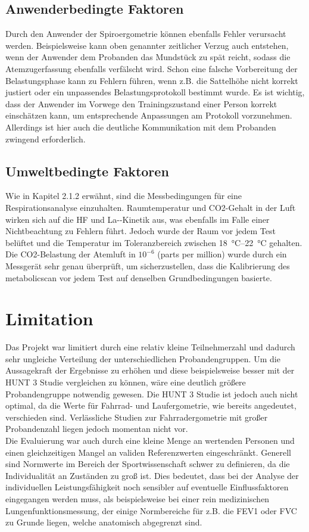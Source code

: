 \subsection{Anwenderbedingte Faktoren}
%
Durch den Anwender der Spiroergometrie können ebenfalls Fehler verursacht werden. Beispielsweise kann oben genannter zeitlicher Verzug auch entstehen, wenn der Anwender dem Probanden das Mundstück zu spät reicht, sodass die Atemzugerfassung ebenfalls verfälscht wird. Schon eine falsche Vorbereitung der Belastungsphase kann zu Fehlern führen, wenn z.B. die Sattelhöhe nicht korrekt justiert oder ein unpassendes Belastungsprotokoll bestimmt wurde. Es ist wichtig, dass der Anwender im Vorwege den Trainingszustand einer Person korrekt einschätzen kann, um entsprechende Anpassungen am Protokoll vorzunehmen. Allerdings ist hier auch die deutliche Kommunikation mit dem Probanden zwingend erforderlich.
%
\subsection{Umweltbedingte Faktoren}
%
Wie in Kapitel 2.1.2 erwähnt, sind die Messbedingungen für eine Respirationsanalyse einzuhalten. Raumtemperatur und \gls{CO2}-Gehalt in der Luft wirken sich auf die \gls{HF} und \gls{La-}-Kinetik aus, was ebenfalls im Falle einer Nichtbeachtung zu Fehlern führt. Jedoch wurde der Raum vor jedem Test belüftet und die Temperatur im Toleranzbereich zwischen \SIrange{18}{22}{\degreeCelsius} gehalten. Die \gls{CO2}-Belastung der Atemluft in $10^{-6}$ (parts per million) wurde durch ein Messgerät sehr genau überprüft, um sicherzustellen, dass die Kalibrierung des metabolicscan vor jedem Test auf denselben Grundbedingungen basierte.
%
\section{Limitation}
%
Das Projekt war limitiert durch eine relativ kleine Teilnehmerzahl und dadurch sehr ungleiche Verteilung der unterschiedlichen Probandengruppen. Um die Aussagekraft der Ergebnisse zu erhöhen und diese beispielsweise besser mit der HUNT 3 Studie vergleichen zu können, wäre eine deutlich größere Probandengruppe notwendig gewesen. Die HUNT 3 Studie ist jedoch auch nicht optimal, da die Werte für Fahrrad- und Laufergometrie, wie bereits angedeutet, verschieden sind. Verlässliche Studien zur Fahrradergometrie mit großer Probandenzahl liegen jedoch momentan nicht vor.\\
Die Evaluierung war auch durch eine kleine Menge an wertenden Personen und einen gleichzeitigen Mangel an validen Referenzwerten eingeschränkt. Generell sind Normwerte im Bereich der Sportwissenschaft schwer zu definieren, da die Individualität an Zuständen zu groß ist. Dies bedeutet, dass bei der Analyse der individuellen Leistungsfähigkeit noch sensibler auf eventuelle Einflussfaktoren eingegangen werden muss, als beispielsweise bei einer rein medizinischen Lungenfunktionsmessung, der einige Normbereiche für z.B. die \gls{FEV1} oder \gls{FVC} zu Grunde liegen, welche anatomisch abgegrenzt sind.
%
